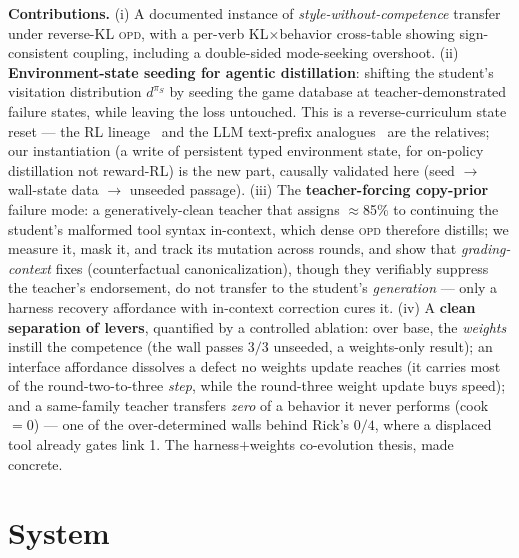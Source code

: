 \documentclass[11pt]{article}
\newcommand{\opd}{\textsc{opd}}
\begin{document}
\textbf{Contributions.} (i) A documented instance of \emph{style-without-competence} transfer
under reverse-KL \opd{}, with a per-verb KL$\times$behavior cross-table showing sign-consistent
coupling, including a double-sided mode-seeking overshoot. (ii) \textbf{Environment-state seeding
for agentic distillation}: shifting the student's visitation distribution $d^{\pi_S}$ by seeding
the game database at teacher-demonstrated failure states, while leaving the loss untouched. This
is a reverse-curriculum state reset --- the RL lineage~\cite{salchen,backplay,goexplore} and the
LLM text-prefix analogues~\cite{bread,trb} are the relatives; our instantiation (a write of
persistent typed environment state, for on-policy distillation not reward-RL) is the new part,
causally validated here (seed $\rightarrow$ wall-state data $\rightarrow$ unseeded passage). (iii) The \textbf{teacher-forcing copy-prior} failure mode:
a generatively-clean teacher that assigns $\approx$85\% to continuing the student's malformed
tool syntax in-context, which dense \opd{} therefore distills; we measure it, mask it, and track
its mutation across rounds, and show that \emph{grading-context} fixes (counterfactual
canonicalization), though they verifiably suppress the teacher's endorsement, do not transfer to
the student's \emph{generation} --- only a harness recovery affordance with in-context correction
cures it. (iv) A \textbf{clean separation of levers}, quantified by a controlled ablation: over base, the
\emph{weights} instill the competence (the wall passes $3/3$ unseeded, a weights-only result); an
interface affordance dissolves a defect no weights update reaches (it carries most of the
round-two-to-three \emph{step}, while the round-three weight update buys speed); and a same-family
teacher transfers \emph{zero} of a behavior it never performs (cook $= 0$) --- one of the
over-determined walls behind Rick's $0/4$, where a displaced tool already gates link 1. The
harness$+$weights co-evolution thesis, made concrete.

\section{System}
\end{document}
